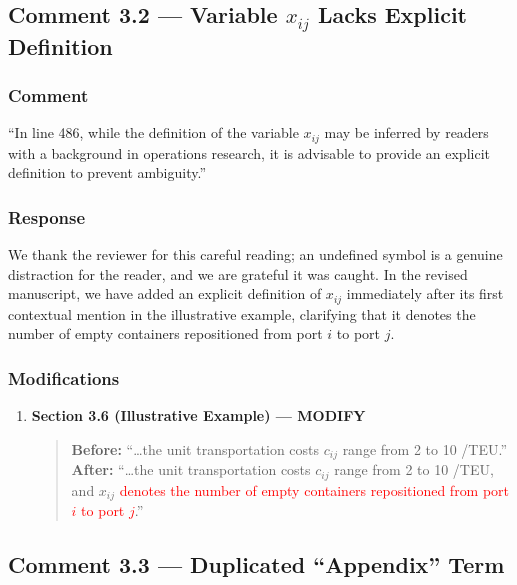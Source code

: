 \documentclass[11pt,a4paper]{article}
\begin{document}
\subsection{Comment 3.2 --- Variable $x_{ij}$ Lacks Explicit Definition}

\subsubsection{Comment}
``In line 486, while the definition of the variable $x_{ij}$ may be inferred by readers with a background in operations research, it is advisable to provide an explicit definition to prevent ambiguity.''

\subsubsection{Response}
We thank the reviewer for this careful reading; an undefined symbol is a genuine distraction for the reader, and we are grateful it was caught. In the revised manuscript, we have added an explicit definition of $x_{ij}$ immediately after its first contextual mention in the illustrative example, clarifying that it denotes the number of empty containers repositioned from port $i$ to port $j$.

\subsubsection{Modifications}
\begin{enumerate}
\item \textbf{Section 3.6 (Illustrative Example) --- MODIFY}
\begin{quote}
\textbf{Before:} ``\ldots the unit transportation costs $c_{ij}$ range from 2 to 10 \textyen/TEU.''\\[4pt]
\textbf{After:} ``\ldots the unit transportation costs $c_{ij}$ range from 2 to 10 \textyen/TEU, and $x_{ij}$ \textcolor{red}{denotes the number of empty containers repositioned from port $i$ to port $j$}.''
\end{quote}
\end{enumerate}

\subsection{Comment 3.3 --- Duplicated ``Appendix'' Term}
\end{document}
